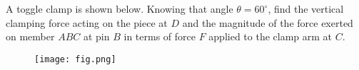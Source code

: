 
A toggle clamp is shown below.  Knowing that angle $\theta = 60^\circ$, find the vertical clamping force acting on the piece at $D$ and the magnitude of the force exerted on member $ABC$ at pin $B$ in terms of force $F$ applied to the clamp arm at $C$.


\begin{figure}[ht!]
  \centering
  \texttt{[image: fig.png]}
\end{figure}

\iftoggle{flagSoln}{%
\vspace{.5cm}
\rule{\textwidth}{.4pt}
\vspace{.5cm}
\textbf{Solution:}
\begin{figure}[ht!]
  \centering
  \texttt{[image: solna.png]}
  \texttt{[image: solnb.png]}
\end{figure}
}{%
}%
